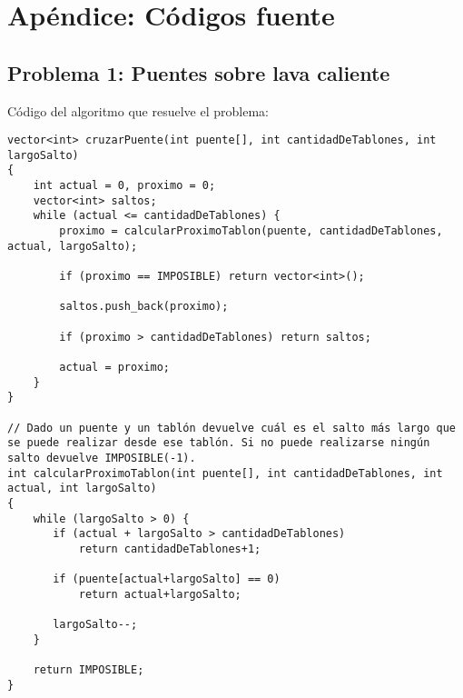 \section{Apéndice: Códigos fuente}

\subsection{Problema 1: Puentes sobre lava caliente}

Código del algoritmo que resuelve el problema:
\begin{lstlisting}[frame=single]
vector<int> cruzarPuente(int puente[], int cantidadDeTablones, int largoSalto)
{
    int actual = 0, proximo = 0;
    vector<int> saltos;
    while (actual <= cantidadDeTablones) {
        proximo = calcularProximoTablon(puente, cantidadDeTablones, actual, largoSalto);

        if (proximo == IMPOSIBLE) return vector<int>();

        saltos.push_back(proximo);

        if (proximo > cantidadDeTablones) return saltos;

        actual = proximo;
    }
}

// Dado un puente y un tablón devuelve cuál es el salto más largo que se puede realizar desde ese tablón. Si no puede realizarse ningún salto devuelve IMPOSIBLE(-1).
int calcularProximoTablon(int puente[], int cantidadDeTablones, int actual, int largoSalto)
{
    while (largoSalto > 0) {
       if (actual + largoSalto > cantidadDeTablones) 
           return cantidadDeTablones+1;
       
       if (puente[actual+largoSalto] == 0)
           return actual+largoSalto;
           
       largoSalto--;
    }

    return IMPOSIBLE;
}
\end{lstlisting}

